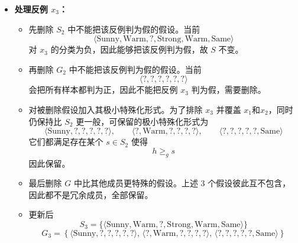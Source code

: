 \documentclass[../main.tex]{subfiles}
\begin{document}
\begin{enumerate}
{\begin{itemize}
        \item \textbf{处理反例 $x_3$：}
        \begin{itemize}
            \item 先删除 $S_2$ 中不能把该反例判为假的假设。当前
            \[
                \langle \text{Sunny}, \text{Warm}, ?, \text{Strong}, \text{Warm}, \text{Same} \rangle
            \]
            对 $x_3$ 的分类为负，因此能够把该反例判为假，故 $S$ 不变。
            \item 再删除 $G_2$ 中不能把该反例判为假的假设。当前
            \[
                \langle ?, ?, ?, ?, ?, ? \rangle
            \]
            会把所有样本都判为正，因此不能把反例 $x_3$ 判为假，需要删除。
            \item 对被删除假设加入其极小特殊化形式。为了排除 $x_3$ 并覆盖 $x_1$和$x_2$，同时仍保持比 $S_2$ 更一般，可保留的极小特殊化形式为
            \[
                \langle \text{Sunny}, ?, ?, ?, ?, ? \rangle,\qquad
                \langle ?, \text{Warm}, ?, ?, ?, ? \rangle,\qquad
                \langle ?, ?, ?, ?, ?, \text{Same} \rangle
            \]
            它们都满足存在某个 $s\in S_2$ 使得
            \[
                h \geq_g s
            \]
            因此保留。
            \item 最后删除 $G$ 中比其他成员更特殊的假设。上述 3 个假设彼此互不包含，因此都不是冗余成员，全部保留。
            \item 更新后
            \[
                S_3=\{\langle \text{Sunny}, \text{Warm}, ?, \text{Strong}, \text{Warm}, \text{Same} \rangle\}
            \]
            \[
                G_3=
                \left\{
                \langle \text{Sunny}, ?, ?, ?, ?, ? \rangle,\,
                \langle ?, \text{Warm}, ?, ?, ?, ? \rangle,\,
                \langle ?, ?, ?, ?, ?, \text{Same} \rangle
                \right\}
            \]
        \end{itemize}


\end{itemize}}
\end{enumerate}
\end{document}
